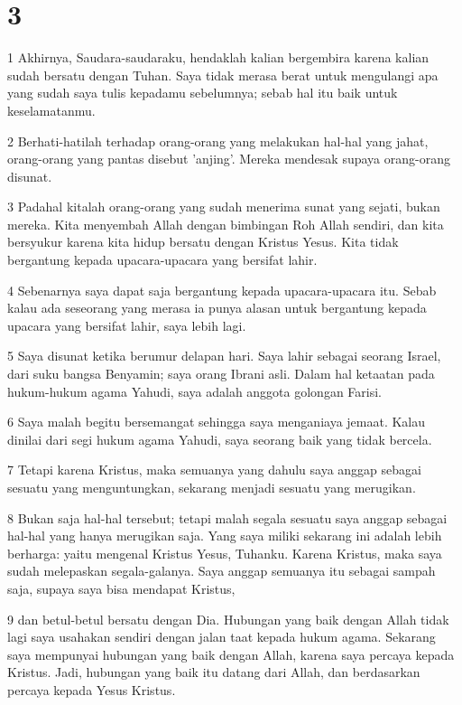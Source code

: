 \chapter{3}

\par 1 Akhirnya, Saudara-saudaraku, hendaklah kalian bergembira karena kalian sudah bersatu dengan Tuhan. Saya tidak merasa berat untuk mengulangi apa yang sudah saya tulis kepadamu sebelumnya; sebab hal itu baik untuk keselamatanmu.
\par 2 Berhati-hatilah terhadap orang-orang yang melakukan hal-hal yang jahat, orang-orang yang pantas disebut 'anjing'. Mereka mendesak supaya orang-orang disunat.
\par 3 Padahal kitalah orang-orang yang sudah menerima sunat yang sejati, bukan mereka. Kita menyembah Allah dengan bimbingan Roh Allah sendiri, dan kita bersyukur karena kita hidup bersatu dengan Kristus Yesus. Kita tidak bergantung kepada upacara-upacara yang bersifat lahir.
\par 4 Sebenarnya saya dapat saja bergantung kepada upacara-upacara itu. Sebab kalau ada seseorang yang merasa ia punya alasan untuk bergantung kepada upacara yang bersifat lahir, saya lebih lagi.
\par 5 Saya disunat ketika berumur delapan hari. Saya lahir sebagai seorang Israel, dari suku bangsa Benyamin; saya orang Ibrani asli. Dalam hal ketaatan pada hukum-hukum agama Yahudi, saya adalah anggota golongan Farisi.
\par 6 Saya malah begitu bersemangat sehingga saya menganiaya jemaat. Kalau dinilai dari segi hukum agama Yahudi, saya seorang baik yang tidak bercela.
\par 7 Tetapi karena Kristus, maka semuanya yang dahulu saya anggap sebagai sesuatu yang menguntungkan, sekarang menjadi sesuatu yang merugikan.
\par 8 Bukan saja hal-hal tersebut; tetapi malah segala sesuatu saya anggap sebagai hal-hal yang hanya merugikan saja. Yang saya miliki sekarang ini adalah lebih berharga: yaitu mengenal Kristus Yesus, Tuhanku. Karena Kristus, maka saya sudah melepaskan segala-galanya. Saya anggap semuanya itu sebagai sampah saja, supaya saya bisa mendapat Kristus,
\par 9 dan betul-betul bersatu dengan Dia. Hubungan yang baik dengan Allah tidak lagi saya usahakan sendiri dengan jalan taat kepada hukum agama. Sekarang saya mempunyai hubungan yang baik dengan Allah, karena saya percaya kepada Kristus. Jadi, hubungan yang baik itu datang dari Allah, dan berdasarkan percaya kepada Yesus Kristus.
